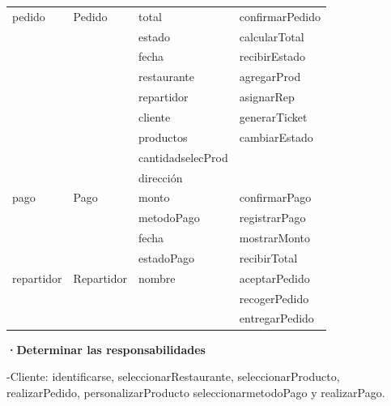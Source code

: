 \documentclass[12pt]{article}
\begin{document}
\begin{table}[H]
\begin{tabular}{|l|l|l|l|}
             &              &                                               & \\ \hline
pedido       & Pedido       & total                                         & confirmarPedido \\
             &              & estado                                        & calcularTotal \\
             &              & fecha                                         & recibirEstado \\
             &              & restaurante                                   & agregarProd \\
             &              & repartidor                                    & asignarRep \\
             &              & cliente                                       & generarTicket \\
             &              & productos                                     & cambiarEstado \\
             &              & cantidadselecProd                             & \\
             &              & dirección                                     & \\ \hline
pago         & Pago         & monto                                         & confirmarPago \\
             &              & metodoPago                                    & registrarPago \\
             &              & fecha                                         & mostrarMonto \\
             &              & estadoPago                                    & recibirTotal \\ \hline
repartidor   & Repartidor   & nombre                                        & aceptarPedido \\ 
             &              &                                               & recogerPedido \\ 
             &              &                                               & entregarPedido \\ \hline
\end{tabular}
\end{table}

\textbf{·Determinar las responsabilidades}

-Cliente: identificarse, seleccionarRestaurante, seleccionarProducto, realizarPedido, personalizarProducto seleccionarmetodoPago y realizarPago. \\
\end{document}

